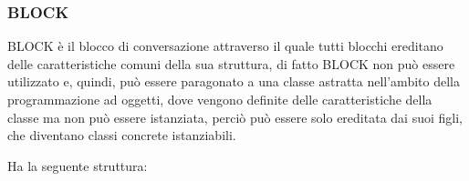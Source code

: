 \subsubsection{BLOCK}

BLOCK è il blocco di conversazione attraverso il quale tutti blocchi ereditano delle caratteristiche comuni della sua struttura, di fatto BLOCK non può essere utilizzato e, quindi, può essere paragonato a una classe astratta nell’ambito della programmazione ad oggetti, dove vengono definite delle caratteristiche della classe ma non può essere istanziata, perciò può essere solo ereditata dai suoi figli, che diventano classi concrete istanziabili.


Ha la seguente struttura:


